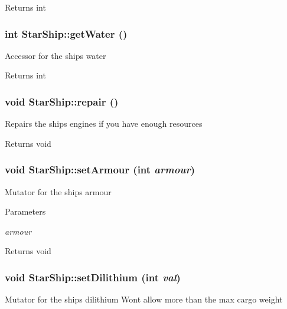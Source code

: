 \begin{DoxyReturn}{Returns}
int 
\end{DoxyReturn}
\hypertarget{classStarShip_a83cb2a208ff3e0925671ab853679c400}{
\subsubsection[{getWater}]{\setlength{\rightskip}{0pt plus 5cm}int StarShip::getWater ()}}
\label{da/d97/classStarShip_a83cb2a208ff3e0925671ab853679c400}
Accessor for the ships water

\begin{DoxyReturn}{Returns}
int 
\end{DoxyReturn}
\hypertarget{classStarShip_a7206221c5678eca12784b38ee333292e}{
\subsubsection[{repair}]{\setlength{\rightskip}{0pt plus 5cm}void StarShip::repair ()}}
\label{da/d97/classStarShip_a7206221c5678eca12784b38ee333292e}
Repairs the ships engines if you have enough resources

\begin{DoxyReturn}{Returns}
void 
\end{DoxyReturn}
\hypertarget{classStarShip_a599c3c86e50738951fc468544fa916e4}{
\subsubsection[{setArmour}]{\setlength{\rightskip}{0pt plus 5cm}void StarShip::setArmour (int {\em armour})}}
\label{da/d97/classStarShip_a599c3c86e50738951fc468544fa916e4}
Mutator for the ships armour


\begin{DoxyParams}{Parameters}
\item[{\em armour}]\end{DoxyParams}
\begin{DoxyReturn}{Returns}
void 
\end{DoxyReturn}
\hypertarget{classStarShip_a99530aa5ae4093bc75d5df1efa5dbdde}{
\subsubsection[{setDilithium}]{\setlength{\rightskip}{0pt plus 5cm}void StarShip::setDilithium (int {\em val})}}
\label{da/d97/classStarShip_a99530aa5ae4093bc75d5df1efa5dbdde}
Mutator for the ships dilithium Wont allow more than the max cargo weight



